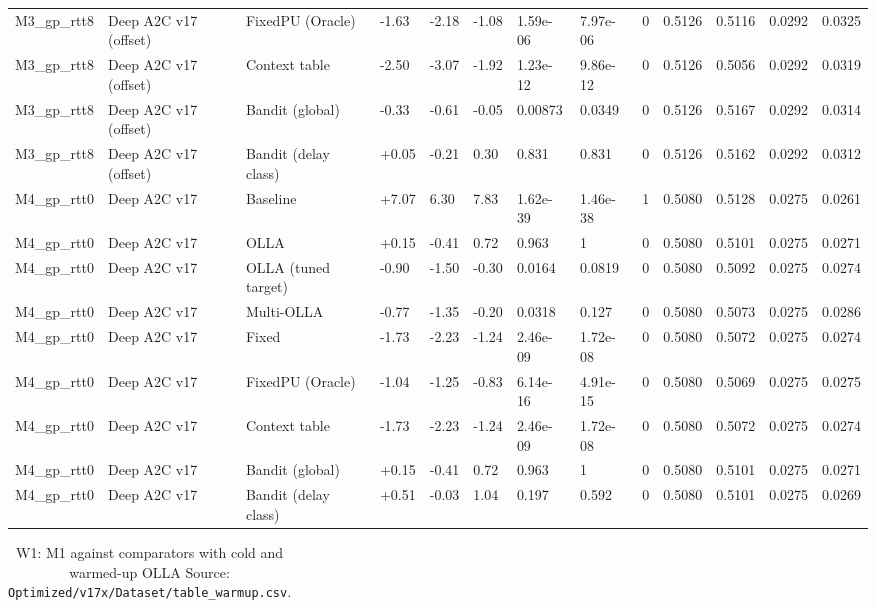 \documentclass[10pt]{article}
\begin{document}
\begin{landscape}
\begin{longtable}{@{}lllllllllllll@{}}
M3\_gp\_rtt8 & Deep A2C v17 (offset) & FixedPU (Oracle) & -1.63 & -2.18 & -1.08 & 1.59e-06 & 7.97e-06 & 0 & 0.5126 & 0.5116 & 0.0292 & 0.0325 \\
M3\_gp\_rtt8 & Deep A2C v17 (offset) & Context table & -2.50 & -3.07 & -1.92 & 1.23e-12 & 9.86e-12 & 0 & 0.5126 & 0.5056 & 0.0292 & 0.0319 \\
M3\_gp\_rtt8 & Deep A2C v17 (offset) & Bandit (global) & -0.33 & -0.61 & -0.05 & 0.00873 & 0.0349 & 0 & 0.5126 & 0.5167 & 0.0292 & 0.0314 \\
M3\_gp\_rtt8 & Deep A2C v17 (offset) & Bandit (delay class) & +0.05 & -0.21 & 0.30 & 0.831 & 0.831 & 0 & 0.5126 & 0.5162 & 0.0292 & 0.0312 \\
M4\_gp\_rtt0 & Deep A2C v17 & Baseline & +7.07 & 6.30 & 7.83 & 1.62e-39 & 1.46e-38 & 1 & 0.5080 & 0.5128 & 0.0275 & 0.0261 \\
M4\_gp\_rtt0 & Deep A2C v17 & OLLA & +0.15 & -0.41 & 0.72 & 0.963 & 1 & 0 & 0.5080 & 0.5101 & 0.0275 & 0.0271 \\
M4\_gp\_rtt0 & Deep A2C v17 & OLLA (tuned target) & -0.90 & -1.50 & -0.30 & 0.0164 & 0.0819 & 0 & 0.5080 & 0.5092 & 0.0275 & 0.0274 \\
M4\_gp\_rtt0 & Deep A2C v17 & Multi-OLLA & -0.77 & -1.35 & -0.20 & 0.0318 & 0.127 & 0 & 0.5080 & 0.5073 & 0.0275 & 0.0286 \\
M4\_gp\_rtt0 & Deep A2C v17 & Fixed & -1.73 & -2.23 & -1.24 & 2.46e-09 & 1.72e-08 & 0 & 0.5080 & 0.5072 & 0.0275 & 0.0274 \\
M4\_gp\_rtt0 & Deep A2C v17 & FixedPU (Oracle) & -1.04 & -1.25 & -0.83 & 6.14e-16 & 4.91e-15 & 0 & 0.5080 & 0.5069 & 0.0275 & 0.0275 \\
M4\_gp\_rtt0 & Deep A2C v17 & Context table & -1.73 & -2.23 & -1.24 & 2.46e-09 & 1.72e-08 & 0 & 0.5080 & 0.5072 & 0.0275 & 0.0274 \\
M4\_gp\_rtt0 & Deep A2C v17 & Bandit (global) & +0.15 & -0.41 & 0.72 & 0.963 & 1 & 0 & 0.5080 & 0.5101 & 0.0275 & 0.0271 \\
M4\_gp\_rtt0 & Deep A2C v17 & Bandit (delay class) & +0.51 & -0.03 & 1.04 & 0.197 & 0.592 & 0 & 0.5080 & 0.5101 & 0.0275 & 0.0269 \\
\bottomrule
\end{longtable}
\normalsize
\tiny
\setlength{\tabcolsep}{2pt}
\begin{longtable}{@{}lllllllllll@{}}
\caption{W1: M1 against comparators with cold and warmed-up OLLA Source: \texttt{Optimized/v17x/Dataset/table\_warmup.csv}.}\\
\toprule

\end{longtable}
\end{landscape}
\end{document}
